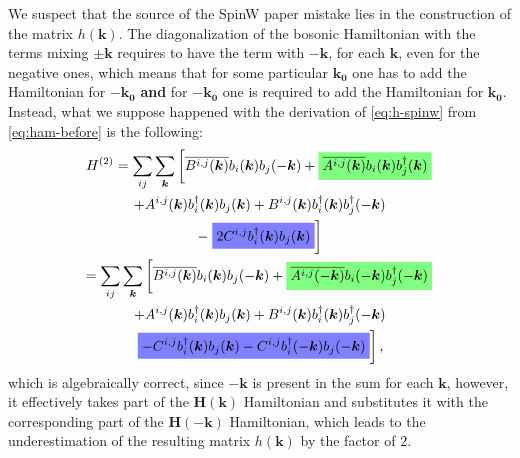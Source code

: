 \documentclass[a4paper,12pt]{article}
\newcommand{\highlightgreen}[1]{%
  \colorbox{green!50}{$\displaystyle#1$}}
\newcommand{\highlightblue}[1]{%
  \colorbox{blue!50}{$\displaystyle#1$}}
\begin{document}
            We suspect that the source of the SpinW paper \cite{toth2015linear} mistake lies in the construction of the matrix $h(\boldsymbol{k})$. 
            The diagonalization of the bosonic Hamiltonian with the terms mixing $\pm\boldsymbol{k}$
            requires to have the term with $-\boldsymbol{k}$, for each $\boldsymbol{k}$, even for the negative ones, 
            which means that for some particular $\boldsymbol{k_0}$ one has to add the Hamiltonian for $-\boldsymbol{k_0}$ \textbf{and} 
            for $-\boldsymbol{k_0}$ one is required to add the Hamiltonian for $\boldsymbol{k_0}$. Instead, what we suppose happened with the derivation of \eqref{eq:h-spinw} 
            from \eqref{eq:ham-before} is the following:
            \begin{multline}
                H^{(2)} = \sum_{ij}\sum_{\boldsymbol{k}}\left[\overline{B^{i,j}(\boldsymbol{k})}b_{i}(\boldsymbol{k})b_{j}(-\boldsymbol{k}) +
                \highlightgreen{\overline{A^{i,j}(\boldsymbol{k})}b_{i}(\boldsymbol{k})b^{\dag}_{j}(\boldsymbol{k})}\right. \\+ 
                A^{i,j}(\boldsymbol{k})b^{\dag}_{i}(\boldsymbol{k})b_{j}(\boldsymbol{k}) +
                B^{i,j}(\boldsymbol{k})b^{\dag}_{i}(\boldsymbol{k})b^{\dag}_{j}(-\boldsymbol{k}) \\-
                \left.\highlightblue{2 C^{i,j}b^{\dag}_{i}(\boldsymbol{k})b_{j}(\boldsymbol{k})}\right]\\
                = \sum_{ij}\sum_{\boldsymbol{k}}\left[\overline{B^{i,j}(\boldsymbol{k})}b_{i}(\boldsymbol{k})b_{j}(-\boldsymbol{k}) +
                \highlightgreen{\overline{A^{i,j}(-\boldsymbol{k})}b_{i}(-\boldsymbol{k})b^{\dag}_{j}(-\boldsymbol{k})}\right. \\+ 
                A^{i,j}(\boldsymbol{k})b^{\dag}_{i}(\boldsymbol{k})b_{j}(\boldsymbol{k}) +
                B^{i,j}(\boldsymbol{k})b^{\dag}_{i}(\boldsymbol{k})b^{\dag}_{j}(-\boldsymbol{k}) \\
                \left.\highlightblue{ -C^{i,j}b^{\dag}_{i}(\boldsymbol{k})b_{j}(\boldsymbol{k}) - C^{i,j}b^{\dag}_{i}(-\boldsymbol{k})b_{j}(-\boldsymbol{k})}\right],\\
            \end{multline}
            which is algebraically correct, since $-\boldsymbol{k}$ is present in the sum for each $\boldsymbol{k}$, however, 
            it effectively takes part of the $\boldsymbol{H}(\boldsymbol{k})$ Hamiltonian and substitutes it 
            with the corresponding part of the $\boldsymbol{H}(-\boldsymbol{k})$ Hamiltonian, 
            which leads to the underestimation of the resulting matrix $h(\boldsymbol{k})$ by the factor of $2$.
    
\end{document}
